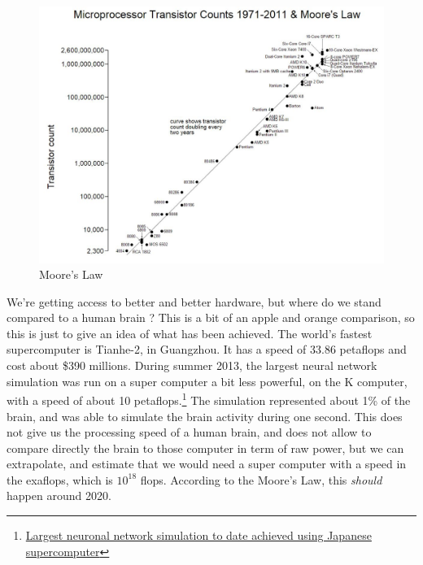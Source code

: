 \documentclass[12pt]{article}
\begin{document}
\begin{figure}[ht]
    \centering
    \includegraphics[width=\textwidth]{moore}
    \caption{Moore's Law}
    \label{fig:moore}
\end{figure}


We're getting access to better and better hardware, but where do we stand
compared to a human brain ? This is a bit of an apple and orange comparison, so
this is just to give an idea of what has been achieved. The world's fastest
supercomputer is Tianhe-2, in Guangzhou. It has a speed of 33.86 \gls{petaflops}
and cost about \$390 millions. During summer 2013, the largest neural network
simulation was run on a super computer a bit less powerful, on the K computer,
with a speed of about 10 petaflops.\footnote{\href{http://www.sciencedaily.com/releases/2013/08/130802080237.htm}
{Largest neuronal network simulation to date achieved using Japanese
supercomputer}} The simulation represented about 1\% of the brain, and was able
to simulate the brain activity during one second. This does not give us the
processing speed of a human brain, and does not allow to compare directly the
brain to those computer in term of raw power, but we can extrapolate, and
estimate that we would need a super computer with a speed in the exaflops, which
is $10^{18}$ flops. According to the Moore's Law, this {\em should} happen around
2020.\\
\end{document}
